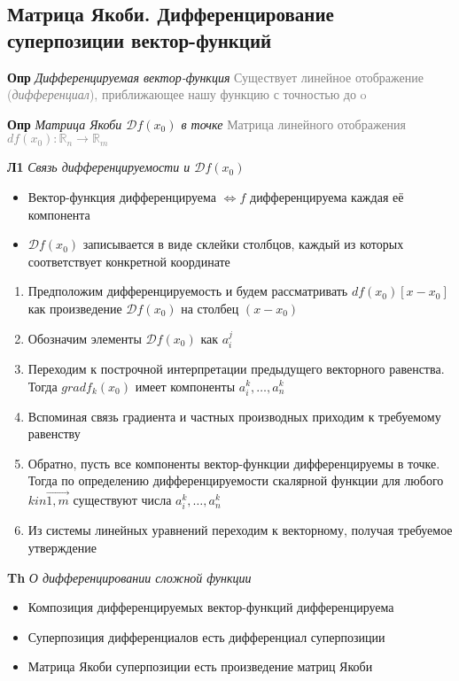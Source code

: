 \subsection{Матрица Якоби. Дифференцирование суперпозиции вектор-функций}

\textbf{Опр} \textit{Дифференцируемая вектор-функция}
\textcolor{gray}{Существует линейное отображение (\textit{дифференциал}), приближающее нашу функцию с точностью до o}

\textbf{Опр} \textit{Матрица Якоби $\mathcal{D} f(x_0)$ в точке}
\textcolor{gray}{Матрица линейного отображения $df(x_0): \mathds{R}_n \rightarrow \mathds{R}_m$}

\textbf{Л1} \textit{Связь дифференцируемости и $\mathcal{D} f(x_0)$}

\begin{itemize}
    \color{blue}
    \item Вектор-функция дифференцируема $\Leftrightarrow f$ дифференцируема каждая её компонента
    \item $\mathcal{D} f(x_0)$ записывается в виде склейки столбцов, каждый из которых соответствует конкретной координате
\end{itemize}

\begin{enumerate}
    \item Предположим дифференцируемость и будем рассматривать $df(x_0)[x - x_0]$ как произведение $\mathcal{D} f(x_0)$
    на столбец $(x - x_0)$
    \item Обозначим элементы $\mathcal{D} f(x_0)$ как $a_i^j$
    \item Переходим к построчной интерпретации предыдущего векторного равенства.
    Тогда $grad f_k(x_0)$ имеет компоненты $a_i^k, \dots, a_n^k$
    \item Вспоминая связь градиента и частных производных приходим к требуемому равенству
    \item Обратно, пусть   все компоненты вектор-функции дифференцируемы в точке.
    Тогда   по   определению   дифференцируемости   скалярной функции для  любого  $k in \overrightarrow{1, m}$
    существуют числа $a_i^k, \dots, a_n^k$
    \item Из системы линейных уравнений переходим к векторному, получая требуемое утверждение
\end{enumerate}

\textbf{Th} \textit{О дифференцировании сложной функции}

\begin{itemize}
    \color{blue}
    \item Композиция дифференцируемых вектор-функций дифференцируема
    \item Суперпозиция дифференциалов есть дифференциал суперпозиции
    \item Матрица Якоби суперпозиции есть произведение матриц Якоби
\end{itemize}


